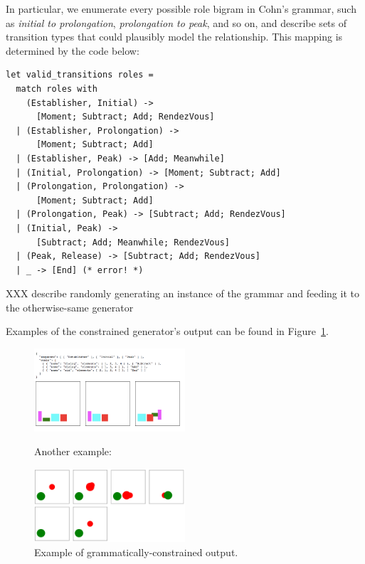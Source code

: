 
In particular, we enumerate every possible role bigram in Cohn's grammar,
such as {\em initial to prolongation}, {\em prolongation to peak}, and so
on, and describe sets of transition types that could plausibly model the
relationship. This mapping is determined by the code below:

\begin{Verbatim}[fontsize=\scriptsize]
let valid_transitions roles =
  match roles with
    (Establisher, Initial) -> 
      [Moment; Subtract; Add; RendezVous]
  | (Establisher, Prolongation) -> 
      [Moment; Subtract; Add]
  | (Establisher, Peak) -> [Add; Meanwhile]
  | (Initial, Prolongation) -> [Moment; Subtract; Add]
  | (Prolongation, Prolongation) -> 
      [Moment; Subtract; Add]
  | (Prolongation, Peak) -> [Subtract; Add; RendezVous]
  | (Initial, Peak) -> 
      [Subtract; Add; Meanwhile; RendezVous]
  | (Peak, Release) -> [Subtract; Add; RendezVous]
  | _ -> [End] (* error! *)
\end{Verbatim}

XXX describe randomly generating an instance of the grammar and feeding it
to the otherwise-same generator

Examples of the constrained generator's output can be found in
Figure~\ref{fig:outgood}.

\begin{figure}
\caption{Example of grammatically-constrained output.}

\includegraphics[width=0.5\textwidth]{comicgen-output-constrained-1.png}

Another example:

\includegraphics[width=0.5\textwidth]{comicgen-output-4.png}

\label{fig:outgood}
\end{figure}



